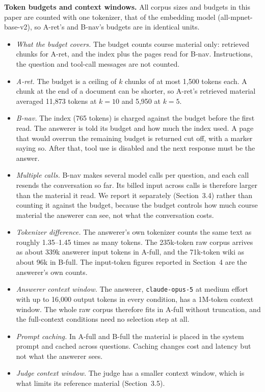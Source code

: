 \documentclass[letterpaper]{article} %
\begin{document}
\textbf{Token budgets and context windows.} All corpus sizes and budgets in this paper are counted with one tokenizer, that of the embedding model (all-mpnet-base-v2), so A-ret's and B-nav's budgets are in identical units.
\begin{itemize}
\item \emph{What the budget covers.} The budget counts course material only: retrieved chunks for A-ret, and the index plus the pages read for B-nav. Instructions, the question and tool-call messages are not counted.
\item \emph{A-ret.} The budget is a ceiling of $k$ chunks of at most 1{,}500 tokens each. A chunk at the end of a document can be shorter, so A-ret's retrieved material averaged 11{,}873 tokens at $k{=}10$ and 5{,}950 at $k{=}5$.
\item \emph{B-nav.} The index (765 tokens) is charged against the budget before the first read. The answerer is told its budget and how much the index used. A page that would overrun the remaining budget is returned cut off, with a marker saying so. After that, tool use is disabled and the next response must be the answer.
\item \emph{Multiple calls.} B-nav makes several model calls per question, and each call resends the conversation so far. Its billed input across calls is therefore larger than the material it read. We report it separately (Section~3.4) rather than counting it against the budget, because the budget controls how much course material the answerer can see, not what the conversation costs.
\item \emph{Tokenizer difference.} The answerer's own tokenizer counts the same text as roughly 1.35--1.45 times as many tokens. The 235k-token raw corpus arrives as about 339k answerer input tokens in A-full, and the 71k-token wiki as about 96k in B-full. The input-token figures reported in Section~4 are the answerer's own counts.
\item \emph{Answerer context window.} The answerer, \texttt{claude-opus-5} at medium effort with up to 16{,}000 output tokens in every condition, has a 1M-token context window. The whole raw corpus therefore fits in A-full without truncation, and the full-context conditions need no selection step at all.
\item \emph{Prompt caching.} In A-full and B-full the material is placed in the system prompt and cached across questions. Caching changes cost and latency but not what the answerer sees.
\item \emph{Judge context window.} The judge has a smaller context window, which is what limits its reference material (Section~3.5).
\end{itemize}
\end{document}

